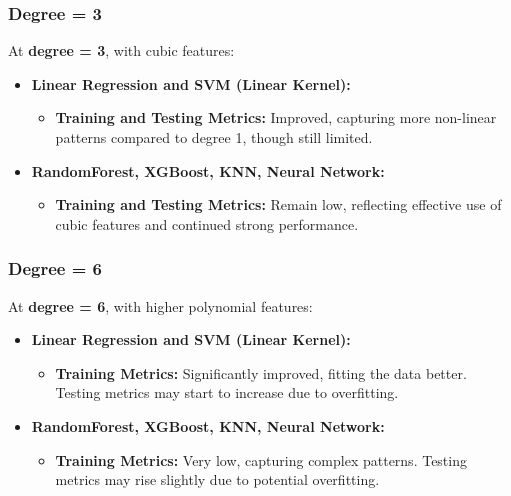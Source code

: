\subsubsection*{Degree = 3}

At \textbf{degree = 3}, with cubic features:

\begin{itemize}
    \item \textbf{Linear Regression and SVM (Linear Kernel):} 
    \begin{itemize}
        \item \textbf{Training and Testing Metrics:} Improved, capturing more non-linear patterns compared to degree 1, though still limited.
    \end{itemize}
    
    \item \textbf{RandomForest, XGBoost, KNN, Neural Network:}
    \begin{itemize}
        \item \textbf{Training and Testing Metrics:} Remain low, reflecting effective use of cubic features and continued strong performance.
    \end{itemize}
\end{itemize}

\subsubsection*{Degree = 6}

At \textbf{degree = 6}, with higher polynomial features:

\begin{itemize}
    \item \textbf{Linear Regression and SVM (Linear Kernel):} 
    \begin{itemize}
        \item \textbf{Training Metrics:} Significantly improved, fitting the data better. Testing metrics may start to increase due to overfitting.
    \end{itemize}
    
    \item \textbf{RandomForest, XGBoost, KNN, Neural Network:}
    \begin{itemize}
        \item \textbf{Training Metrics:} Very low, capturing complex patterns. Testing metrics may rise slightly due to potential overfitting.
    \end{itemize}
\end{itemize}

